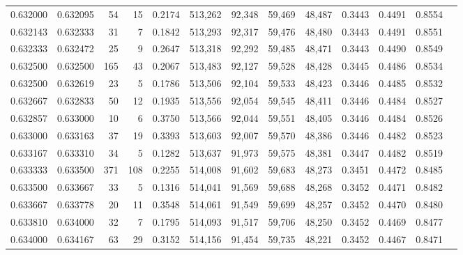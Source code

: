 \begin{tabular}{rrrrrrrrrrrrr}
0.632000 & 0.632095 &    54 &  15 &                                     0.2174 & 513,262 &  92,348 &  59,469 &  48,487 & 0.3443 & 0.4491 & 0.8554 \\
0.632143 & 0.632333 &    31 &   7 &                                     0.1842 & 513,293 &  92,317 &  59,476 &  48,480 & 0.3443 & 0.4491 & 0.8551 \\
0.632333 & 0.632472 &    25 &   9 &                                     0.2647 & 513,318 &  92,292 &  59,485 &  48,471 & 0.3443 & 0.4490 & 0.8549 \\
0.632500 & 0.632500 &   165 &  43 &                                     0.2067 & 513,483 &  92,127 &  59,528 &  48,428 & 0.3445 & 0.4486 & 0.8534 \\
0.632500 & 0.632619 &    23 &   5 &                                     0.1786 & 513,506 &  92,104 &  59,533 &  48,423 & 0.3446 & 0.4485 & 0.8532 \\
0.632667 & 0.632833 &    50 &  12 &                                     0.1935 & 513,556 &  92,054 &  59,545 &  48,411 & 0.3446 & 0.4484 & 0.8527 \\
0.632857 & 0.633000 &    10 &   6 &                                     0.3750 & 513,566 &  92,044 &  59,551 &  48,405 & 0.3446 & 0.4484 & 0.8526 \\
0.633000 & 0.633163 &    37 &  19 &                                     0.3393 & 513,603 &  92,007 &  59,570 &  48,386 & 0.3446 & 0.4482 & 0.8523 \\
0.633167 & 0.633310 &    34 &   5 &                                     0.1282 & 513,637 &  91,973 &  59,575 &  48,381 & 0.3447 & 0.4482 & 0.8519 \\
0.633333 & 0.633500 &   371 & 108 &                                     0.2255 & 514,008 &  91,602 &  59,683 &  48,273 & 0.3451 & 0.4472 & 0.8485 \\
0.633500 & 0.633667 &    33 &   5 &                                     0.1316 & 514,041 &  91,569 &  59,688 &  48,268 & 0.3452 & 0.4471 & 0.8482 \\
0.633667 & 0.633778 &    20 &  11 &                                     0.3548 & 514,061 &  91,549 &  59,699 &  48,257 & 0.3452 & 0.4470 & 0.8480 \\
0.633810 & 0.634000 &    32 &   7 &                                     0.1795 & 514,093 &  91,517 &  59,706 &  48,250 & 0.3452 & 0.4469 & 0.8477 \\
0.634000 & 0.634167 &    63 &  29 &                                     0.3152 & 514,156 &  91,454 &  59,735 &  48,221 & 0.3452 & 0.4467 & 0.8471 \\

\end{tabular}
